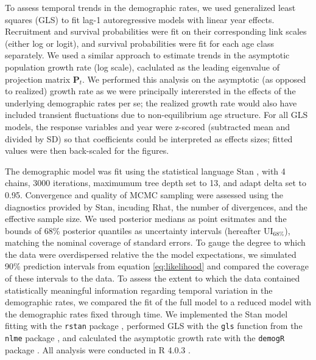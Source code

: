 \documentclass[11pt]{article}
\begin{document}
To assess temporal trends in the demographic rates, 
we used generalized least squares  (GLS) to fit lag-1 autoregressive models
with linear year effects.
Recruitment and survival probabilities were fit on their corresponding link scales 
(either log or logit),
and survival probabilities were fit for each age class separately.
We used a similar approach to estimate trends in the asymptotic population growth rate
(log scale), 
caclulated as the leading eigenvalue of projection matrix $\mathbf{P}_{t}$.
We performed this analysis on the asymptotic (as opposed to realized) growth rate 
as we were principally interersted in the effects 
of the underlying demographic rates per se; 
the realized growth rate would also have included transient fluctuations due to
non-equilibrium age structure.
For all GLS models, the response variables and year were z-scored 
(subtracted mean and divided by SD) so that coefficients
could be interpreted as effects sizes;
fitted values were then back-scaled for the figures.

The demographic model was fit using the statistical language Stan \citep{carpenter2017stan},
with 4 chains, 3000 iterations, maximumum tree depth set to 13, and adapt delta set to 0.95.
Convergence and quality of MCMC sampling were assessed using the diagnostics provided by Stan, 
incuding Rhat, the number of divergences, and the effective sample size.
We used posterior medians as point esitmates 
and the bounds of 68\% posterior quantiles as uncertainty intervals 
(hereafter $\text{UI}_{68\%}$), 
matching the nominal coverage of standard errors.
To gauge the degree to which the data were overdispersed relative 
the the model expectations, 
we simulated 90\% prediction intervals from equation \ref{eq:likelihood} 
and compared the coverage of these intervals to the data.
To assess the extent to which the data contained statistically meaningful information 
regarding temporal variation in the demographic rates,
we compared the fit of the full model to a reduced model with the demographic
rates fixed through time.
We implemented the Stan model fitting with the \texttt{rstan} package \citep{stan2020rstan},
performed GLS with the \texttt{gls} function from the \texttt{nlme} package \citep{pinheiro2020nlme}, 
and calculated the asymptotic growth rate with the \texttt{demogR} package \citep{holland2007demogR}.
All analysis were conducted in R 4.0.3 \citep{r2020}. 





\end{document}
